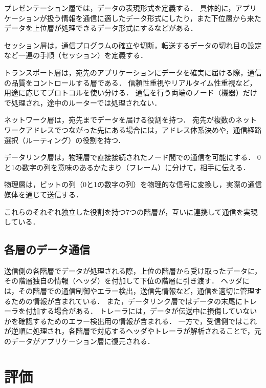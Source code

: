 \documentclass[12pt,a4j,titlepage]{ltjsarticle}
\begin{document}
プレゼンテーション層では，データの表現形式を定義する．
具体的に，アプリケーションが扱う情報を通信に適したデータ形式にしたり，また下位層から来たデータを上位層が処理できるデータ形式にするなどがある．

セッション層は，通信プログラムの確立や切断，転送するデータの切れ目の設定など一連の手順（セッション）を定義する．

トランスポート層は，宛先のアプリケーションにデータを確実に届ける際，通信の品質をコントロールする層である．
信頼性重視やリアルタイム性重視など，用途に応じてプロトコルを使い分ける．
通信を行う両端のノード（機器）だけで処理され，途中のルーターでは処理されない．

ネットワーク層は，宛先までデータを届ける役割を持つ．
宛先が複数のネットワークアドレスでつながった先にある場合には，アドレス体系決めや，通信経路選択（ルーティング）の役割を持つ．

データリンク層は，物理層で直接接続されたノード間での通信を可能にする．
0と1の数字の列を意味のあるかたまり（フレーム）に分けて，相手に伝える．

物理層は，ビットの列（0と1の数字の列）を物理的な信号に変換し，実際の通信媒体を通じて送信する．

これらのそれぞれ独立した役割を持つ7つの階層が，互いに連携して通信を実現している．

\subsection{各層のデータ通信}
送信側の各階層でデータが処理される際，上位の階層から受け取ったデータに，その階層独自の情報（ヘッダ）を付加して下位の階層に引き渡す．
ヘッダには，その階層での通信制御やエラー検出，送信先情報など，通信を適切に管理するための情報が含まれている．
また，データリンク層ではデータの末尾にトレーラを付加する場合がある．
トレーラには，データが伝送中に損傷していないかを確認するためのエラー検出用の情報が含まれる．
一方で，受信側ではこれが逆順に処理され，各階層で対応するヘッダやトレーラが解析されることで，元のデータがアプリケーション層に復元される．





\section{評価}
\subsection{}
\end{document}
